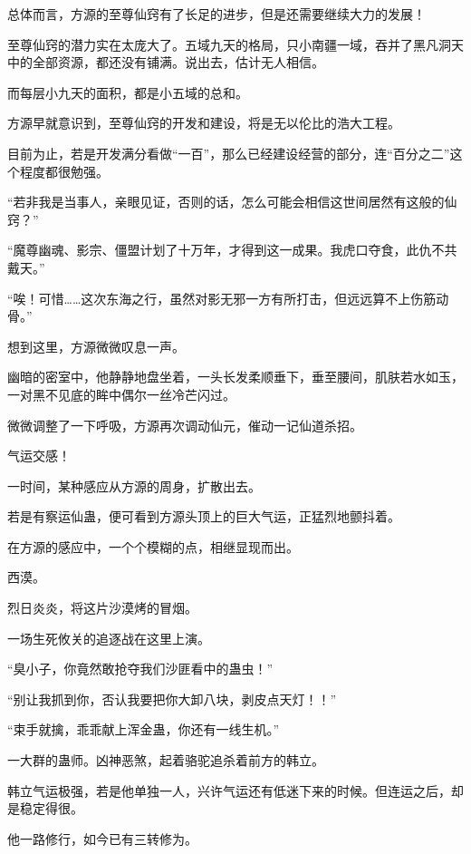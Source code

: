 
\begin{this_body}



总体而言，方源的至尊仙窍有了长足的进步，但是还需要继续大力的发展！

至尊仙窍的潜力实在太庞大了。五域九天的格局，只小南疆一域，吞并了黑凡洞天中的全部资源，都还没有铺满。说出去，估计无人相信。

而每层小九天的面积，都是小五域的总和。

方源早就意识到，至尊仙窍的开发和建设，将是无以伦比的浩大工程。

目前为止，若是开发满分看做“一百”，那么已经建设经营的部分，连“百分之二”这个程度都很勉强。

“若非我是当事人，亲眼见证，否则的话，怎么可能会相信这世间居然有这般的仙窍？”

“魔尊幽魂、影宗、僵盟计划了十万年，才得到这一成果。我虎口夺食，此仇不共戴天。”

“唉！可惜……这次东海之行，虽然对影无邪一方有所打击，但远远算不上伤筋动骨。”

想到这里，方源微微叹息一声。

幽暗的密室中，他静静地盘坐着，一头长发柔顺垂下，垂至腰间，肌肤若水如玉，一对黑不见底的眸中偶尔一丝冷芒闪过。

微微调整了一下呼吸，方源再次调动仙元，催动一记仙道杀招。

气运交感！

一时间，某种感应从方源的周身，扩散出去。

若是有察运仙蛊，便可看到方源头顶上的巨大气运，正猛烈地颤抖着。

在方源的感应中，一个个模糊的点，相继显现而出。

西漠。

烈日炎炎，将这片沙漠烤的冒烟。

一场生死攸关的追逐战在这里上演。

“臭小子，你竟然敢抢夺我们沙匪看中的蛊虫！”

“别让我抓到你，否认我要把你大卸八块，剥皮点天灯！！”

“束手就擒，乖乖献上浑金蛊，你还有一线生机。”

一大群的蛊师。凶神恶煞，起着骆驼追杀着前方的韩立。

韩立气运极强，若是他单独一人，兴许气运还有低迷下来的时候。但连运之后，却是稳定得很。

他一路修行，如今已有三转修为。


\end{this_body}
